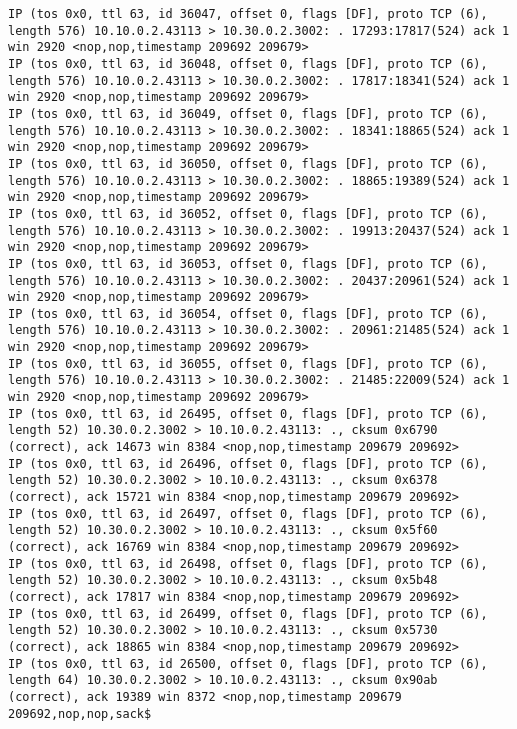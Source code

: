 \documentclass[a4paper,12pt]{article}
\begin{document}
\begin{lstlisting}
IP (tos 0x0, ttl 63, id 36047, offset 0, flags [DF], proto TCP (6), length 576) 10.10.0.2.43113 > 10.30.0.2.3002: . 17293:17817(524) ack 1 win 2920 <nop,nop,timestamp 209692 209679>
IP (tos 0x0, ttl 63, id 36048, offset 0, flags [DF], proto TCP (6), length 576) 10.10.0.2.43113 > 10.30.0.2.3002: . 17817:18341(524) ack 1 win 2920 <nop,nop,timestamp 209692 209679>
IP (tos 0x0, ttl 63, id 36049, offset 0, flags [DF], proto TCP (6), length 576) 10.10.0.2.43113 > 10.30.0.2.3002: . 18341:18865(524) ack 1 win 2920 <nop,nop,timestamp 209692 209679>
IP (tos 0x0, ttl 63, id 36050, offset 0, flags [DF], proto TCP (6), length 576) 10.10.0.2.43113 > 10.30.0.2.3002: . 18865:19389(524) ack 1 win 2920 <nop,nop,timestamp 209692 209679>
IP (tos 0x0, ttl 63, id 36052, offset 0, flags [DF], proto TCP (6), length 576) 10.10.0.2.43113 > 10.30.0.2.3002: . 19913:20437(524) ack 1 win 2920 <nop,nop,timestamp 209692 209679>
IP (tos 0x0, ttl 63, id 36053, offset 0, flags [DF], proto TCP (6), length 576) 10.10.0.2.43113 > 10.30.0.2.3002: . 20437:20961(524) ack 1 win 2920 <nop,nop,timestamp 209692 209679>
IP (tos 0x0, ttl 63, id 36054, offset 0, flags [DF], proto TCP (6), length 576) 10.10.0.2.43113 > 10.30.0.2.3002: . 20961:21485(524) ack 1 win 2920 <nop,nop,timestamp 209692 209679>
IP (tos 0x0, ttl 63, id 36055, offset 0, flags [DF], proto TCP (6), length 576) 10.10.0.2.43113 > 10.30.0.2.3002: . 21485:22009(524) ack 1 win 2920 <nop,nop,timestamp 209692 209679>
IP (tos 0x0, ttl 63, id 26495, offset 0, flags [DF], proto TCP (6), length 52) 10.30.0.2.3002 > 10.10.0.2.43113: ., cksum 0x6790 (correct), ack 14673 win 8384 <nop,nop,timestamp 209679 209692>
IP (tos 0x0, ttl 63, id 26496, offset 0, flags [DF], proto TCP (6), length 52) 10.30.0.2.3002 > 10.10.0.2.43113: ., cksum 0x6378 (correct), ack 15721 win 8384 <nop,nop,timestamp 209679 209692>
IP (tos 0x0, ttl 63, id 26497, offset 0, flags [DF], proto TCP (6), length 52) 10.30.0.2.3002 > 10.10.0.2.43113: ., cksum 0x5f60 (correct), ack 16769 win 8384 <nop,nop,timestamp 209679 209692>
IP (tos 0x0, ttl 63, id 26498, offset 0, flags [DF], proto TCP (6), length 52) 10.30.0.2.3002 > 10.10.0.2.43113: ., cksum 0x5b48 (correct), ack 17817 win 8384 <nop,nop,timestamp 209679 209692>
IP (tos 0x0, ttl 63, id 26499, offset 0, flags [DF], proto TCP (6), length 52) 10.30.0.2.3002 > 10.10.0.2.43113: ., cksum 0x5730 (correct), ack 18865 win 8384 <nop,nop,timestamp 209679 209692>
IP (tos 0x0, ttl 63, id 26500, offset 0, flags [DF], proto TCP (6), length 64) 10.30.0.2.3002 > 10.10.0.2.43113: ., cksum 0x90ab (correct), ack 19389 win 8372 <nop,nop,timestamp 209679 209692,nop,nop,sack$

\end{lstlisting}
\end{document}
